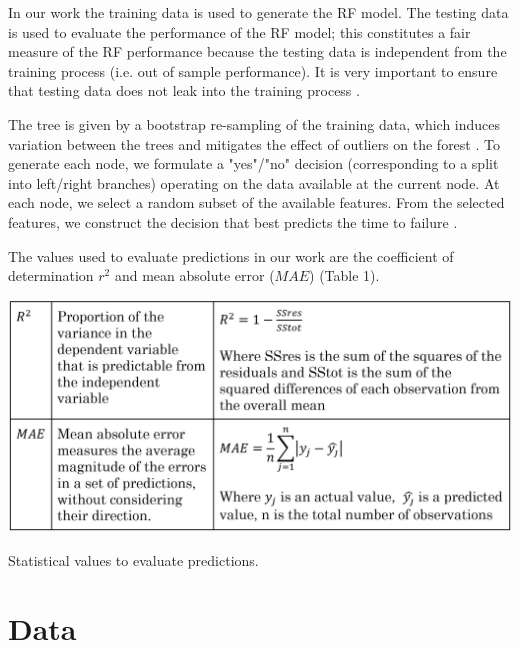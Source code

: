 \documentclass[]{llncs} %
\begin{document}
In our work the training data is used to generate the RF model. The testing data is used to evaluate the performance of the RF model; this constitutes a fair measure of the RF performance because the testing data is independent from the training process (i.e. out of sample performance). It is very important to ensure that testing data does not leak into the training process \cite{Bertrand}. \par
The tree is given by a bootstrap re-sampling of the training data, which induces variation between the trees and mitigates the effect of outliers on the forest \cite{Bertrand}. To generate each node, we formulate a "yes"/"no" decision (corresponding to a split into left/right branches) operating on the data available at the current node. At each node, we select a random subset of the available features. From the selected features, we construct the decision that best predicts the time to failure \cite{Bertrand}. \par
The values used to evaluate predictions in our work are the coefficient of determination $r^2$ and mean absolute error ($MAE$) (Table 1). \par
\begin{table}
	\centering
	\includegraphics[width=.9\linewidth]{background}
	\caption{Statistical values to evaluate predictions.}
	\label{fig:background}
\end{table}

\section{Data} 
\end{document}
